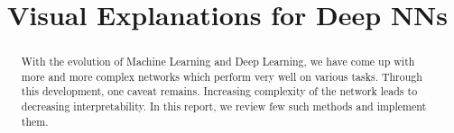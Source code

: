 \documentclass[conference]{IEEEtran}
\begin{document}
\title{Visual Explanations for Deep NNs}


\author{
\and
{}
}

\maketitle

\begin{abstract}
With the evolution of Machine Learning and Deep Learning, we have come up with more and more complex networks which perform very well on various tasks. Through this development, one caveat remains. Increasing complexity of the network leads to decreasing interpretability. In this report, we review few such methods and implement them. 
\end{abstract}
\end{document}
